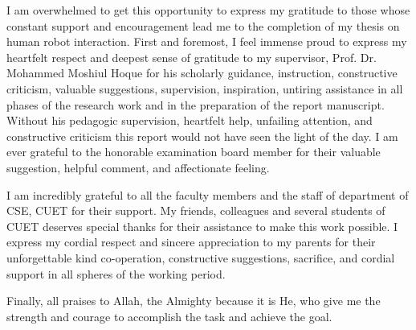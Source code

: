 I am overwhelmed to get this opportunity to express my gratitude to those whose constant support and encouragement lead me to the completion of my thesis on human robot interaction.
First and foremost, I feel immense proud to express my heartfelt respect and deepest sense of gratitude to my supervisor, Prof. Dr. Mohammed Moshiul Hoque for his scholarly guidance, instruction, constructive criticism, valuable suggestions, supervision, inspiration, untiring assistance in all phases of the research work and in the preparation of the report manuscript. Without his pedagogic supervision, heartfelt help, unfailing attention, and constructive criticism this report would not have seen the light of the day. I am ever grateful to the honorable examination board member for their valuable suggestion, helpful comment, and affectionate feeling.

I am incredibly grateful to all the faculty members
and the staff of department of CSE, CUET for their support. My friends, colleagues and several students  of CUET deserves special thanks for their assistance to make this work possible.
I express my cordial respect and sincere appreciation to my parents for their unforgettable kind co-operation, constructive suggestions, sacrifice, and cordial support in all spheres of the working period.

 Finally, all praises to Allah, the Almighty because it is He, who give me the strength and courage to accomplish the task and achieve the goal. 
